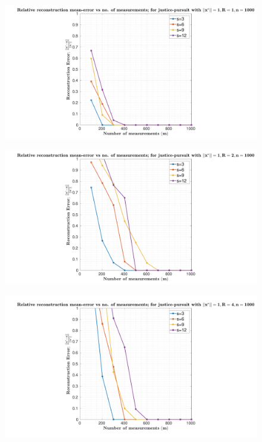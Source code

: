 \begin{figure}[h!]
	\begin{center}
		\includegraphics[width=\linewidth]{./fig/plot-1-1_sparse.pdf}
	\end{center}
	\caption{}
	\label{fig:plot-2-1}
\end{figure}


\begin{figure}[h]
	\begin{center}
		\includegraphics[width=\linewidth]{./fig/plot-1-2_sparse.pdf}
	\end{center}
	\caption{}
	\label{fig:plot-2-2}
\end{figure}


\begin{figure}[h]
	\begin{center}
		\includegraphics[width=\linewidth]{./fig/plot-1-3_sparse.pdf}
	\end{center}
	\caption{}
	\label{fig:plot-2-3}
\end{figure}